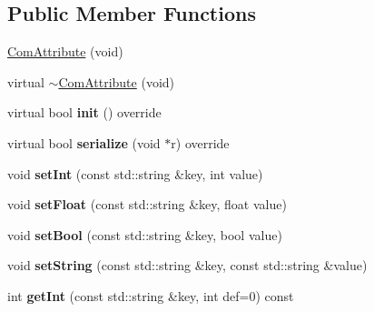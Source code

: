 \subsection*{Public Member Functions}
\begin{DoxyCompactItemize}
\item 
\hyperlink{classcocostudio_1_1ComAttribute_adb9f109392486c4c6484ba806f47207f}{Com\+Attribute} (void)
\item 
virtual \hyperlink{classcocostudio_1_1ComAttribute_a5f52792b74480b88dcea5801f0314e54}{$\sim$\+Com\+Attribute} (void)
\item 
\mbox{\label{classcocostudio_1_1ComAttribute_a303d9319adaf826bd800b4b275c50e43}} 
virtual bool {\bfseries init} () override
\item 
\mbox{\label{classcocostudio_1_1ComAttribute_ab6dcf2f1065e2c3ecb9bb08ab571439b}} 
virtual bool {\bfseries serialize} (void $\ast$r) override
\item 
\mbox{\label{classcocostudio_1_1ComAttribute_a90fe680a304fc2aa1a239dca6f00c9f7}} 
void {\bfseries set\+Int} (const std\+::string \&key, int value)
\item 
\mbox{\label{classcocostudio_1_1ComAttribute_a0ff638ca919a0f70090071c25fb79934}} 
void {\bfseries set\+Float} (const std\+::string \&key, float value)
\item 
\mbox{\label{classcocostudio_1_1ComAttribute_ac4a475fb5add1234f3d130b1e68dd200}} 
void {\bfseries set\+Bool} (const std\+::string \&key, bool value)
\item 
\mbox{\label{classcocostudio_1_1ComAttribute_ac3b82d8c2c67dcbc913d6d5d40c4c239}} 
void {\bfseries set\+String} (const std\+::string \&key, const std\+::string \&value)
\item 
\mbox{\label{classcocostudio_1_1ComAttribute_a091c0900eac36cd4134d5611acb597c1}} 
int {\bfseries get\+Int} (const std\+::string \&key, int def=0) const
\item 
\mbox{\label{classcocostudio_1_1ComAttribute_a95d1d838dbb402b63f20ff203efeb62c}} 

\end{DoxyCompactItemize}

